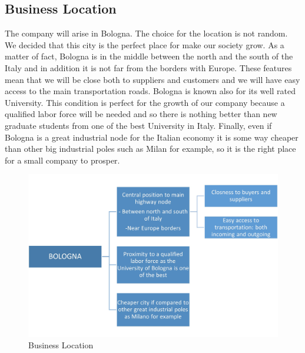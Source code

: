 \subsection{Business Location}
The company will arise in Bologna. The choice for the location is not random. We decided that this city is the perfect place for make our society grow. As a matter of fact, Bologna is in the middle between the north and the south of the Italy and in addition it is not far from the borders with Europe. These features mean that we will be close both to suppliers and customers and we will have easy access to the main transportation roads.
Bologna is known also for its well rated University. This condition is perfect for the growth of our company because a qualified labor force will be needed and so there is nothing better than new graduate students from one of the best University in Italy.
Finally, even if Bologna is a great industrial node for the Italian economy it is some way cheaper than other big industrial poles such as Milan for example, so it is the right place for a small company to prosper.
\begin{figure}[H]
\centering
\includegraphics[width=1\textwidth]{images/Location.jpg}
\caption{Business Location}
\end{figure}

